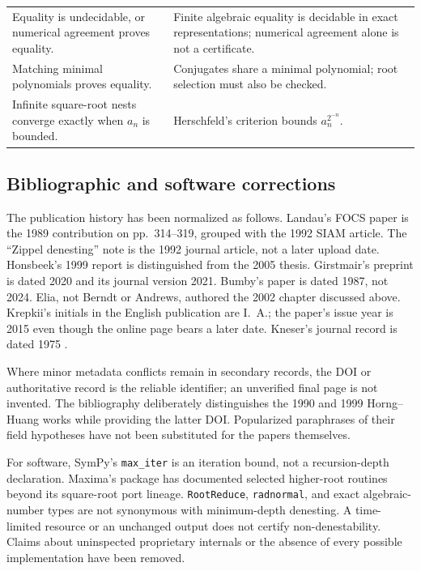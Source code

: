 \documentclass[11pt,letterpaper]{article}
\numberwithin{equation}{section}
\theoremstyle{definition}
\theoremstyle{remark}
\begin{document}
\begin{longtable}{@{}p{}p{}@{}}
Equality is undecidable, or numerical agreement proves equality. & Finite algebraic equality is decidable in exact representations; numerical agreement alone is not a certificate.\\[5pt]
Matching minimal polynomials proves equality. & Conjugates share a minimal polynomial; root selection must also be checked.\\[5pt]
Infinite square-root nests converge exactly when $a_n$ is bounded. & Herschfeld's criterion bounds $a_n^{2^{-n}}$.\\
\end{longtable}

\subsection{Bibliographic and software corrections}
The publication history has been normalized as follows. Landau's FOCS paper is the 1989 contribution on pp.~314--319, grouped with the 1992 SIAM article. The ``Zippel denesting'' note is the 1992 journal article, not a later upload date. Honsbeek's 1999 report is distinguished from the 2005 thesis. Girstmair's preprint is dated 2020 and its journal version 2021. Bumby's paper is dated 1987, not 2024. Elia, not Berndt or Andrews, authored the 2002 chapter discussed above. Krepkii's initials in the English publication are I.~A.; the paper's issue year is 2015 even though the online page bears a later date. Kneser's journal record is dated 1975 \cite{landau,landauzippel,honsbeek99,honsbeek,girstmair,bumby,elia,krepkii,kneser}.

Where minor metadata conflicts remain in secondary records, the DOI or authoritative record is the reliable identifier; an unverified final page is not invented. The bibliography deliberately distinguishes the 1990 and 1999 Horng--Huang works while providing the latter DOI. Popularized paraphrases of their field hypotheses have not been substituted for the papers themselves.

For software, SymPy's \texttt{max\_iter} is an iteration bound, not a recursion-depth declaration. Maxima's package has documented selected higher-root routines beyond its square-root port lineage. \texttt{RootReduce}, \texttt{radnormal}, and exact algebraic-number types are not synonymous with minimum-depth denesting. A time-limited resource or an unchanged output does not certify non-denestability. Claims about uninspected proprietary internals or the absence of every possible implementation have been removed.
\end{document}
